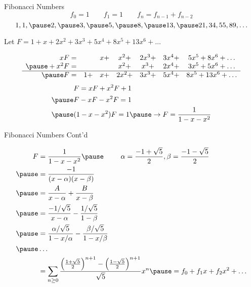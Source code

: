 \documentclass[xcolor=dvipsnames]{beamer}
\newcommand{\ds}{\displaystyle}
\begin{document}
\begin{frame}{Fibonacci Numbers}
  $$ f_0 = 1 \qquad f_1 = 1 \qquad f_n = f_{n-1} + f_{n-2} $$
  \pause
  $$ 1,1,\pause 2, \pause 3, \pause 5, \pause 8, \pause 13, 
    \pause 21,34, 55,89, \ldots $$
  \pause

  Let $\ds F = 1 + x + 2x^2 + 3x^3 + 5x^4 + 8x^5 + 13x^6 + \ldots $
  \vspace{1pc}

  \pause
  $$
  \begin{array}{rcccccc}
    xF =& & x+& x^2+ & 2x^3+& 3x^4 +& 5x^5 + 8x^6+ \ldots \\
    \pause
    +x^2F= & &  & x^2 +& x^3+& 2x^4 +& 3x^5 + 5x^6+ \ldots \\
    \hline \pause
    F = &1+ & x+& 2x^2+&3x^3+&5x^4 +& 8x^5 +13x^6 + \ldots
  \end{array} $$
  \pause
  $$ \begin{aligned} 
   &F = xF + x^2F + 1 \\ \pause
   &F - xF - x^2F = 1 \\ \pause
   &(1 - x - x^2) F = 1 \pause \rightarrow F = \frac{1}{1-x-x^2}
  \end{aligned} $$

\end{frame}


\begin{frame}{Fibonacci Numbers Cont'd}

  $$ \begin{aligned} 
    F &= \frac{1}{1 - x - x^2} \pause
      \hspace{2pc} 
     \alpha = \frac{-1+ \sqrt{5}}{2}, \beta=\frac{-1-\sqrt{5}}{2} \\ \pause
      &= \frac{-1}{(x-\alpha)(x-\beta)} \\ \pause
      &= \frac{A}{x - \alpha} + \frac{B}{x - \beta} \\ \pause
      &= \frac{-1/\sqrt{5}}{x - \alpha} - \frac{1/\sqrt{5}}{1-\beta} \\ \pause
      &= \frac{\alpha/\sqrt{5}}{1 - x/\alpha} - 
            \frac{\beta/\sqrt{5}}{1 - x/\beta} \\ \pause
      & \ldots \\
      & = \sum_{n \geq 0} \frac{\left(\frac{1+\sqrt{5}}{2}\right)^{n+1} - 
                \left(\frac{1 - \sqrt{5}}{2}\right)^{n+1}}{\sqrt{5}}x^n
        \pause  = f_0 + f_1 x + f_2 x^2 + \ldots
  \end{aligned}$$
\end{frame}
\end{document}
